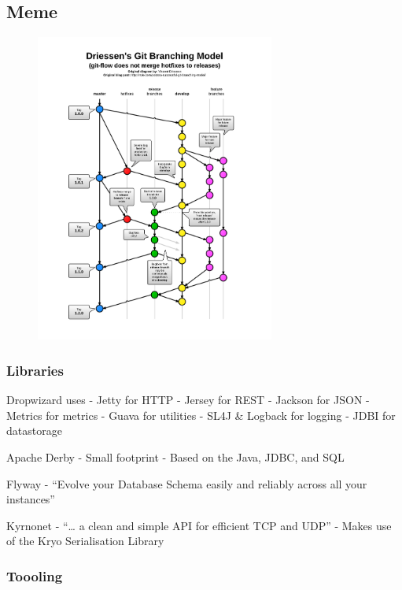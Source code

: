 \documentclass[10pt,a4paper]{article}
\begin{document}
	\begin{multicols}{3}

	\section{Meme}

	 \begin{figure}[h!]
	    \centering
	    \includegraphics[width=0.7\textwidth]{git-flow-flipped.png}
	 \end{figure}
	
	 \subsubsection{Libraries}\label{libraries}

Dropwizard uses - Jetty for HTTP - Jersey for REST - Jackson for JSON -
Metrics for metrics - Guava for utilities - SL4J \& Logback for logging
- JDBI for datastorage

Apache Derby - Small footprint - Based on the Java, JDBC, and SQL

Flyway - ``Evolve your Database Schema easily and reliably across all
your instances''

Kyrnonet - ``\ldots{} a clean and simple API for efficient TCP and UDP''
- Makes use of the Kryo Serialisation Library

\subsubsection{Toooling}\label{toooling}


\end{multicols}
\end{document}
